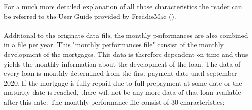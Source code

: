     For a much more detailed explanation of all those characteristics 
    the reader can be referred to the User Guide provided by FreddieMac (\cite{FredieMac}). 
    \\\\
    Additional to the originate data file, the monthly performances
    are also combined in a file per year. This "monthly performances file" 
    consist of the monthly development of the mortgages.  
    This data is therefore dependent on time and thus yields the monthly 
    information about the development of the loan. 
    The data of every loan is monthly determined from the first payment 
    date until september 2020. If the mortgage is fully repaid due to 
    full prepayment at some date or the maturity date is reached, 
    there will not be any more data of that loan available after this date.  
    The monthly performance file consist of 30 characteristics: 
